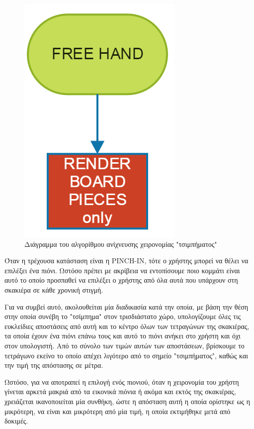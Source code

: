 \begin{figure}[H]
    \centering
    \includegraphics[scale=0.5, angle=0]{Files/Figures/free_hand.png}
    \caption[Διάγραμμα του αλγορίθμου ανίχνευσης χειρονομίας "τσιμπήματος"]{Διάγραμμα του αλγορίθμου ανίχνευσης χειρονομίας "τσιμπήματος"}
    \label{fig:gesture_rec}
\end{figure}



Όταν η τρέχουσα κατάσταση είναι η PINCH-IN, τότε ο χρήστης μπορεί να θέλει να επιλέξει ένα πιόνι. Ωστόσο πρέπει με ακρίβεια να εντοπίσουμε ποιο κομμάτι είναι αυτό το οποίο προσπαθεί να επιλέξει ο χρήστης από όλα αυτά που υπάρχουν στη σκακιέρα σε κάθε χρονική στιγμή. 

Για να συμβεί αυτό, ακολουθείται μία διαδικασία κατά την οποία, με βάση την θέση στην οποία συνέβη το "τσίμπημα" στον τρισδιάστατο χώρο, υπολογίζουμε όλες τις ευκλείδιες αποστάσεις από αυτή και το κέντρο όλων των τετραγώνων της σκακιέρας, τα οποία έχουν ένα πιόνι επάνω τους και αυτό το πιόνι ανήκει στο χρήστη και όχι στον υπολογιστή. Από το σύνολο των τιμών αυτών των αποστάσεων, βρίσκουμε το τετράγωνο εκείνο το οποίο απέχει λιγότερο από το σημείο "τσιμπήματος", καθώς και την τιμή της απόστασης σε μέτρα. 


Ωστόσο, για να αποτραπεί η επιλογή ενός πιονιού, όταν η χειρονομία του χρήστη γίνεται αρκετά μακριά από τα εικονικά πιόνια ή ακόμα και εκτός της σκακιέρας, χρειάζεται ικανοποιείται μία συνθήκη, ώστε η απόσταση αυτή η οποία ορίστηκε ως η μικρότερη, να είναι και μικρότερη από μία τιμή, η οποία εκτιμήθηκε μετά από δοκιμές.


